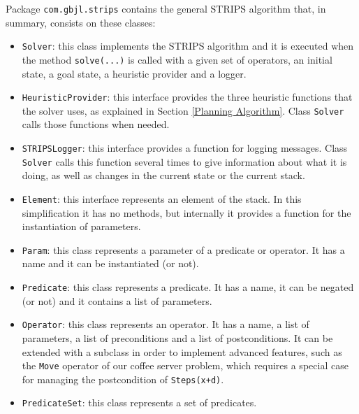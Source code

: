 \documentclass[12pt,a4paper,oneside]{article}
\numberwithin{equation}{section}
\numberwithin{equation}{section}
\theoremstyle{definition}
\begin{document}
\begin{itemize}
Package \texttt{com.gbjl.strips} contains the general STRIPS algorithm that, in summary, consists on these classes:
\begin{itemize}
	\item \texttt{Solver}: this class implements the STRIPS algorithm and it is executed when the method \texttt{solve(...)} is called with a given set of operators, an initial state, a goal state, a heuristic provider and a logger.
	\item \texttt{HeuristicProvider}: this interface provides the three heuristic functions that the solver uses, as explained in Section \ref{Planning Algorithm}. Class \texttt{Solver} calls those functions when needed.
	\item \texttt{STRIPSLogger}: this interface provides a function for logging messages. Class \texttt{Solver} calls this function several times to give information about what it is doing, as well as changes in the current state or the current stack.
	\item \texttt{Element}: this interface represents an element of the stack. In this simplification it has no methods, but internally it provides a function for the instantiation of parameters.
	\item \texttt{Param}: this class represents a parameter of a predicate or operator. It has a name and it can be instantiated (or not).
	\item \texttt{Predicate}: this class represents a predicate. It has a name, it can be negated (or not) and it contains a list of parameters.
	\item \texttt{Operator}: this class represents an operator. It has a name, a list of parameters, a list of preconditions and a list of postconditions. It can be extended with a subclass in order to implement advanced features, such as the \texttt{Move} operator of our coffee server problem, which requires a special case for managing the postcondition of \texttt{Steps(x+d)}.
	\item \texttt{PredicateSet}: this class represents a set of predicates.
\end{itemize}



\end{itemize}
\end{document}
